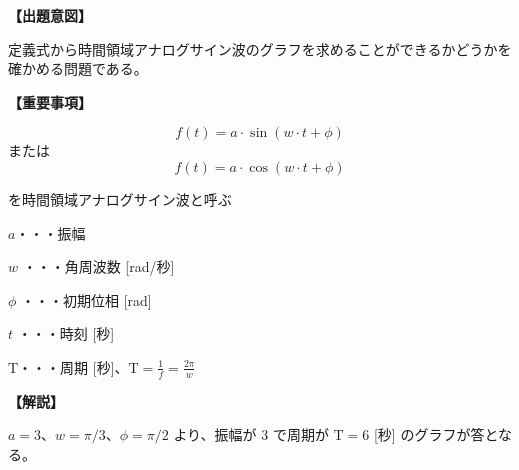 \noindent \textbf{【出題意図】}

\noindent 定義式から時間領域アナログサイン波のグラフを求めることができるかどうかを確かめる問題である。

\vspace{1em}
\noindent \textbf{【重要事項】}

\[
f(t) = a \cdot \sin( w \cdot t + \phi )
\]
%
\noindent または
%
\[
f(t) = a \cdot \cos( w \cdot t + \phi )
\]

\medskip
\noindent を時間領域アナログサイン波と呼ぶ

\bigskip
\noindent $a$・・・振幅

\bigskip
\noindent $w$ ・・・角周波数 [rad/秒]

\bigskip
\noindent $\phi$ ・・・初期位相 [rad]

\bigskip
\noindent $t$ ・・・時刻 [秒]

\bigskip
$\textrm{T}$・・・周期 [秒]、$\textrm{T} = \frac{1}{f} = \frac{2\pi}{w}$

\vspace{1em}
\noindent \textbf{【解説】}

\noindent $a = 3$、$w = \pi/3$、$\phi = \pi/2$ より、振幅が $3$ で周期が $\textrm{T} = 6$ [秒] のグラフが答となる。
